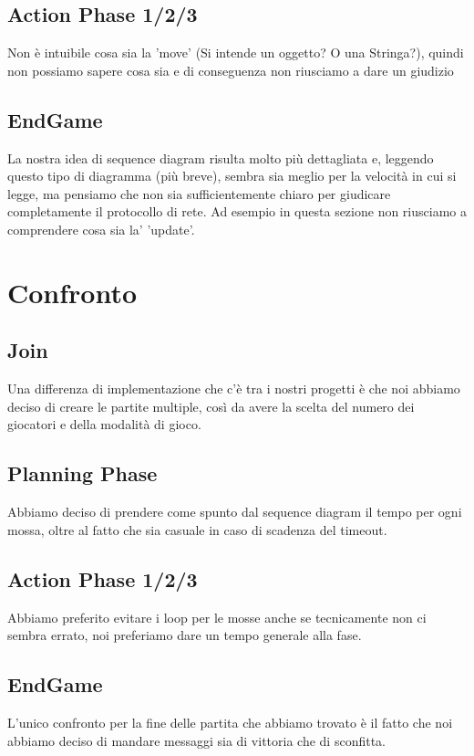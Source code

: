 \documentclass[12pt]{article}
\begin{document}
\subsection{Action Phase 1/2/3}
Non è intuibile cosa sia la 'move' (Si intende un oggetto? O una Stringa?), quindi non possiamo sapere cosa sia e di conseguenza non riusciamo a dare un giudizio 
\subsection{EndGame}
La nostra idea di sequence diagram risulta molto più dettagliata e, leggendo questo tipo di diagramma (più breve), sembra sia meglio per la velocità in cui si legge, ma pensiamo che non sia sufficientemente chiaro per giudicare completamente il protocollo di rete. Ad esempio in questa sezione non riusciamo a comprendere cosa sia la' 'update'.

\section{Confronto}
\subsection{Join}
Una differenza di implementazione che c'è tra i nostri progetti è che noi abbiamo deciso di creare le partite multiple, così da avere la scelta del numero dei giocatori e della modalità di gioco.
\subsection{Planning Phase}
Abbiamo deciso di prendere come spunto dal sequence diagram il tempo per ogni mossa, oltre al fatto che sia casuale in caso di scadenza del timeout.
\subsection{Action Phase 1/2/3}
Abbiamo preferito evitare i loop per le mosse anche se tecnicamente non ci sembra errato, noi preferiamo dare un tempo generale alla fase.
\subsection{EndGame}
L'unico confronto per la fine delle partita che abbiamo trovato è il fatto che noi abbiamo deciso di mandare messaggi sia di vittoria che di sconfitta.
\end{document}
